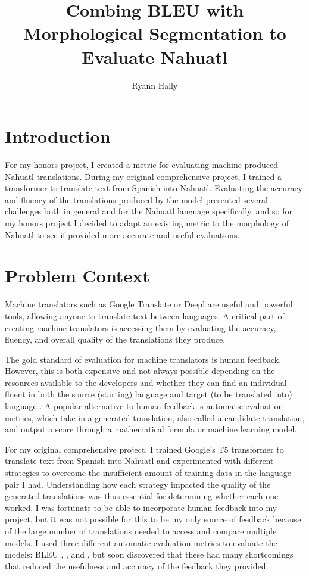 \documentclass[10pt,twocolumn]{article}
\title{Combing BLEU with Morphological Segmentation to Evaluate Nahuatl}
\author{Ryann Hally}
\affiliation{Occidental College}
\begin{document}
\maketitle

\section{Introduction}
For my honors project, I created a metric for evaluating machine-produced Nahuatl translations. During my original comprehensive project, I trained a transformer to translate text from Spanish into Nahuatl. Evaluating the accuracy and fluency of the translations produced by the model presented several challenges both in general and for the Nahuatl language specifically, and so for my honors project I decided to adapt an existing metric to the morphology of Nahuatl to see if provided more accurate and useful evaluations.


\section{Problem Context}

Machine translators such as Google Translate \cite{GoogleTranslate} or Deepl \cite{Deepl} are useful and powerful tools, allowing anyone to translate text between languages. A critical part of creating machine translators is accessing them by evaluating the accuracy, fluency, and overall quality of the translations they produce. 

The gold standard of evaluation for machine translators is human feedback. However, this is both expensive and not always possible depending on the resources available to the developers and whether they can find an individual fluent in both the source (starting) language and target (to be translated into) language \cite{BLEUCritique}. A popular alternative to human feedback is automatic evaluation metrics, which take in a generated translation, also called a candidate translation, and output a score through a mathematical formula or machine learning model.

For my original comprehensive project, I trained Google's T5 transformer to translate  text from Spanish into Nahuatl and experimented with different strategies to overcome the insufficient amount of training data in the language pair I had. Understanding how each strategy impacted the quality of the generated translations was thus essential for determining whether each one worked. I was fortunate to be able to incorporate human feedback into my project, but it was not possible for this to be my only source of feedback because of the large number of translations needed to access and compare multiple models. I used three different automatic evaluation metrics to evaluate the models: BLEU \cite{BLEU}, \cite{ChrF}, and \cite{COMETHF}, but soon discovered that these had many shortcomings that reduced the usefulness and accuracy of the feedback they provided.
\end{document}
